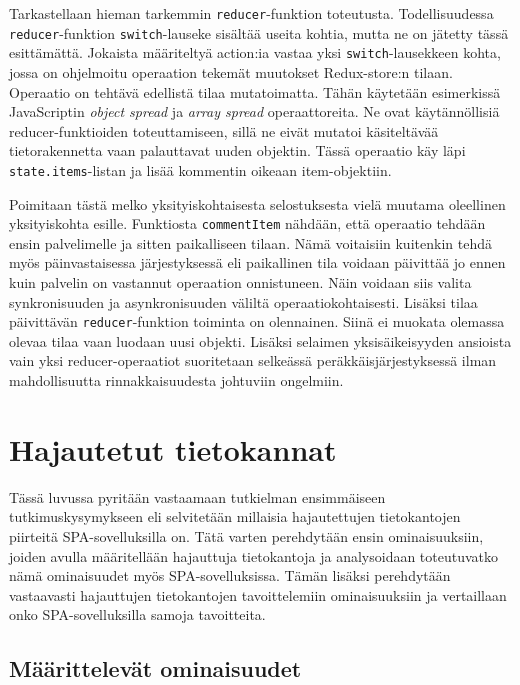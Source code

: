 \documentclass[finnish,twoside,censored,csm,sw-track-2018]{HYthesisML}
\begin{document}
Tarkastellaan hieman tarkemmin \verb+reducer+-funktion toteutusta. Todellisuudessa \verb+reducer+-funktion \verb+switch+-lauseke sisältää useita kohtia, mutta ne on jätetty tässä esittämättä. Jokaista määriteltyä action:ia vastaa yksi \verb+switch+-lausekkeen kohta, jossa on ohjelmoitu operaation tekemät muutokset Redux-store:n tilaan. Operaatio on tehtävä edellistä tilaa mutatoimatta. Tähän käytetään esimerkissä JavaScriptin \textit{object spread} ja \textit{array spread} operaattoreita. Ne ovat käytännöllisiä reducer-funktioiden toteuttamiseen, sillä ne eivät mutatoi käsiteltävää tietorakennetta vaan palauttavat uuden objektin. Tässä operaatio käy läpi \verb+state.items+-listan ja lisää kommentin oikeaan item-objektiin.

Poimitaan tästä melko yksityiskohtaisesta selostuksesta vielä muutama oleellinen yksityiskohta esille. Funktiosta \verb+commentItem+ nähdään, että operaatio tehdään ensin palvelimelle ja sitten paikalliseen tilaan. Nämä voitaisiin kuitenkin tehdä myös päinvastaisessa järjestyksessä eli paikallinen tila voidaan päivittää jo ennen kuin palvelin on vastannut operaation onnistuneen. Näin voidaan siis valita synkronisuuden ja asynkronisuuden väliltä operaatiokohtaisesti. Lisäksi tilaa päivittävän \verb+reducer+-funktion toiminta on olennainen. Siinä ei muokata olemassa olevaa tilaa vaan luodaan uusi objekti. Lisäksi selaimen yksisäikeisyyden ansioista vain yksi reducer-operaatiot suoritetaan selkeässä peräkkäisjärjes\-tyksessä ilman mahdollisuutta rinnakkaisuudesta johtuviin ongelmiin.

\chapter{Hajautetut tietokannat}

Tässä luvussa pyritään vastaamaan tutkielman ensimmäiseen tutkimuskysymykseen eli selvitetään millaisia hajautettujen tietokantojen piirteitä SPA-sovelluksilla on. Tätä varten perehdytään ensin ominaisuuksiin, joiden avulla määritellään hajauttuja tietokantoja ja analysoidaan toteutuvatko nämä ominaisuudet myös SPA-sovelluksissa. Tämän lisäksi perehdytään vastaavasti hajauttujen tietokantojen tavoittelemiin ominaisuuksiin ja vertaillaan onko SPA-sovelluksilla samoja tavoitteita.

\section{Määrittelevät ominaisuudet}
\end{document}

